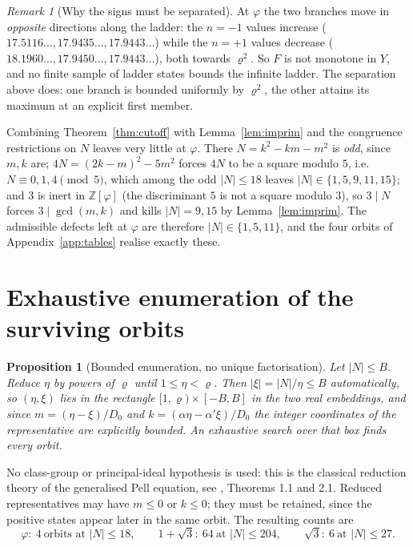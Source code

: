 \documentclass[11pt]{article}
\newtheorem{proposition}[theorem]{Proposition}
\theoremstyle{definition}
\theoremstyle{remark}
\newtheorem{remark}[theorem]{Remark}
\newcommand{\Z}{\mathbb{Z}}
\newcommand{\pr}{\varrho}
\begin{document}
\begin{remark}[Why the signs must be separated]\label{rem:signsep}
At $\varphi$ the two branches move in \emph{opposite} directions along the ladder: the $n=-1$
values increase ($17.5116\ldots,17.9435\ldots,17.9443\ldots$) while the $n=+1$ values decrease
($18.1960\ldots,17.9450\ldots,17.9443\ldots$), both towards $\pr^2$. So $F$ is not monotone in
$Y$, and no finite sample of ladder states bounds the infinite ladder. The separation above
does: one branch is bounded uniformly by $\pr^2$, the other attains its maximum at an explicit
first member.
\end{remark}

Combining Theorem~\ref{thm:cutoff} with Lemma~\ref{lem:imprim} and the congruence restrictions
on $N$ leaves very little at $\varphi$. There $N=k^2-km-m^2$ is \emph{odd}, since $m,k$ are;
$4N=(2k-m)^2-5m^2$ forces $4N$ to be a square modulo $5$, i.e.\ $N\equiv0,1,4\pmod5$, which
among the odd $|N|\le18$ leaves $|N|\in\{1,5,9,11,15\}$; and $3$ is inert in $\Z[\varphi]$
(the discriminant $5$ is not a square modulo $3$), so $3\mid N$ forces $3\mid\gcd(m,k)$ and
kills $|N|=9,15$ by Lemma~\ref{lem:imprim}. The admissible defects left at $\varphi$ are
therefore $|N|\in\{1,5,11\}$, and the four orbits of Appendix~\ref{app:tables} realise exactly
these.

\section{Exhaustive enumeration of the surviving orbits}\label{sec:enum}

\begin{proposition}[Bounded enumeration, no unique factorisation]\label{prop:enum}
Let $|N|\le B$. Reduce $\eta$ by powers of $\pr$ until $1\le\eta<\pr$. Then
$|\xi|=|N|/\eta\le B$ automatically, so $(\eta,\xi)$ lies in the rectangle
$[1,\pr)\times[-B,B]$ in the two real embeddings, and since $m=(\eta-\xi)/D_0$ and
$k=(\alpha\eta-\alpha'\xi)/D_0$ the integer coordinates of the representative are explicitly
bounded. An exhaustive search over that box finds every orbit.
\end{proposition}

No class-group or principal-ideal hypothesis is used: this is the classical reduction theory of
the generalised Pell equation, see \cite{Conrad}, Theorems 1.1 and 2.1. Reduced representatives may
have $m\le0$ or $k\le0$; they must be retained, since the positive states appear later in the
same orbit. The resulting counts are
\[
\varphi:\ 4\ \text{orbits at }|N|\le18,\qquad
1+\sqrt3:\ 64\ \text{at }|N|\le204,\qquad
\sqrt3:\ 6\ \text{at }|N|\le27 .
\]
\end{document}
